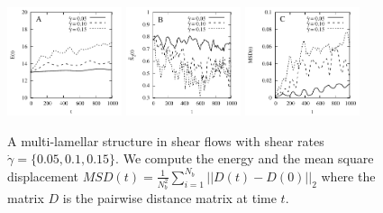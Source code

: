 \documentclass[aps,prl,preprint,groupedaddress]{revtex4-2}
\begin{document}
\begin{figure}
  \begin{center}
  \includegraphics[width=0.3\textwidth]{MS_E.pdf}
   \includegraphics[width=0.3\textwidth]{MS_LOP.pdf}
    \includegraphics[width=0.3\textwidth]{MS_MSD.pdf}
  \end{center}
      \caption{A multi-lamellar structure in shear flows with shear rates $\dot\gamma=\{0.05, 0.1, 0.15\}$. We compute the energy and the mean square displacement $MSD(t) = \frac{1}{N_b^2}\sum_{i=1}^{N_b} ||D(t)-D(0) ||_2$ where the matrix $D$ is the pairwise distance matrix at time $t$.    }
\end{figure}
\end{document}
